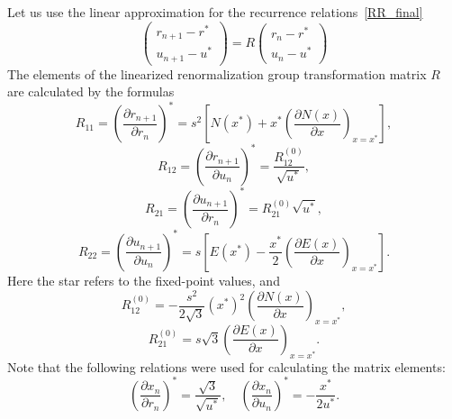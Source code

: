 Let us use the linear approximation for the recurrence relations~\eqref{RR_final}
\begin{equation}
	\label{eq:linear_rr}
	\left(
		\begin{array}{c}
			r_{n+1} - r^* \\
			u_{n+1} - u^*
		\end{array}
	\right)
	= R
	\left(
		\begin{array}{c}
			r_{n} - r^* \\
			u_{n} - u^*
		\end{array}
	\right)
\end{equation}
The elements of the linearized renormalization group transformation matrix $R$ are calculated by the formulas
\begin{equation*}
	R_{11} = \left(\frac{\partial r_{n+1}}{\partial r_n}\right)^* = s^2 \left[N(x^*) + x^* \left(\frac{\partial N(x)}{\partial x} \right)_{x=x^*} \right],
\end{equation*}
\begin{equation*}
	R_{12} = \left(\frac{\partial r_{n+1}}{\partial u_n}\right)^* = \frac{R_{12}^{(0)}}{\sqrt{u^*}},
\end{equation*}
\begin{equation*}
	R_{21} = \left(\frac{\partial u_{n+1}}{\partial r_n}\right)^* = R_{21}^{(0)} \sqrt{u^*},
\end{equation*}
\begin{equation*}
	R_{22} = \left(\frac{\partial u_{n+1}}{\partial u_n}\right)^* = s \left[E(x^*) - \frac{x^*}{2} \left(\frac{\partial E(x)}{\partial x}\right)_{x=x^*}\right].
\end{equation*}
Here the star refers to the fixed-point values, and
\begin{equation*}
	R_{12}^{(0)} = -\frac{s^2}{2\sqrt{3}} (x^*)^2 \left(\frac{\partial N(x)}{\partial x} \right)_{x=x^*},
\end{equation*}
\begin{equation*}
	R_{21}^{(0)} = s\sqrt{3} \left(\frac{\partial E(x)}{\partial x}\right)_{x=x^*}.
\end{equation*}
Note that the following relations were used for calculating the matrix elements:
\begin{equation*}
	\left(\frac{\partial x_n}{\partial r_n}\right)^* = \frac{\sqrt{3}}{\sqrt{u^*}}, 
	\quad
	\left(\frac{\partial x_n}{\partial u_n}\right)^* = - \frac{x^*}{2u^*}.
\end{equation*}

